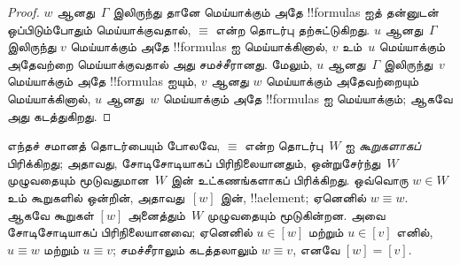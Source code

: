 \documentclass[../../../include/open-logic-section]{subfiles}
\begin{document}
\begin{proof}
  $w$ ஆனது~$\Gamma$ இலிருந்து தானே மெய்யாக்கும் அதே !!{formula}s ஐத்
  தன்னுடன் ஒப்பிடும்போதும் மெய்யாக்குவதால், $\equiv$ என்ற தொடர்பு
  தற்சுட்டுகிறது. $u$ ஆனது~$\Gamma$ இலிருந்து $v$ மெய்யாக்கும் அதே
  !!{formula}s ஐ மெய்யாக்கினால், $v$ உம்~$u$ மெய்யாக்கும் அதேவற்றை
  மெய்யாக்குவதால் அது சமச்சீரானது. மேலும், $u$ ஆனது~$\Gamma$ இலிருந்து~$v$
  மெய்யாக்கும் அதே !!{formula}s ஐயும், $v$ ஆனது $w$ மெய்யாக்கும்
  அதேவற்றையும் மெய்யாக்கினால், $u$ ஆனது~$w$ மெய்யாக்கும் அதே
  !!{formula}s ஐ மெய்யாக்கும்; ஆகவே அது கடத்துகிறது.
\end{proof}

எந்தச் சமானத் தொடர்பையும் போலவே, $\equiv$ என்ற தொடர்பு~$W$ ஐ
\emph{கூறுகளாகப்} பிரிக்கிறது; அதாவது, சோடிசோடியாகப் பிரிநிலையானதும்,
ஒன்றுசேர்ந்து~$W$ முழுவதையும் மூடுவதுமான~$W$ இன் உட்கணங்களாகப் பிரிக்கிறது.
ஒவ்வொரு $w \in W$ உம் கூறுகளில் ஒன்றின், அதாவது~$[w]$ இன்,
!!a{element}; ஏனெனில் $w \equiv w$. ஆகவே கூறுகள் $[w]$ அனைத்தும்~$W$
முழுவதையும் மூடுகின்றன. அவை சோடிசோடியாகப் பிரிநிலையானவை; ஏனெனில்
$u \in [w]$ மற்றும் $u \in [v]$ எனில், $u \equiv w$ மற்றும் $u \equiv v$;
சமச்சீராலும் கடத்தலாலும் $w \equiv v$, எனவே $[w] = [v]$.
\end{document}
